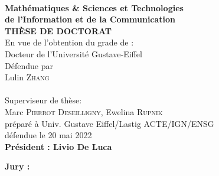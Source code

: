 \begin{titlepage}
\begin{center}
	
\vspace*{0.3cm}
 \\
\noindent \textbf{Math{\'e}matiques \& Sciences et Technologies\\de l’Information et de la Communication} \\
\vspace*{0.5cm}
\noindent \Huge \textbf{THÈSE DE DOCTORAT} \\
\vspace*{0.3cm}
\noindent \large {En vue de l’obtention du grade de :} \\
\vspace*{0.3cm}
\noindent \Large Docteur de l'Université Gustave-Eiffel\\
\vspace*{0.4cm}
\noindent \large {Défendue par\\}
\noindent \huge Lulin \textsc{Zhang} \\
\vspace*{0.8cm}
 \\
\vspace*{0.8cm}
\noindent \Large Superviseur de thèse: \\
Marc \textsc{Pierrot Deseilligny}, Ewelina \textsc{Rupnik}\\
\vspace*{0.2cm}
\noindent \Large préparé à Univ. Gustave Eiffel/Lastig ACTE/IGN/ENSG\\
\vspace*{0.2cm}
\noindent \large défendue le 20 mai 2022 \\
\vspace*{0.5cm}
\noindent \large \textbf{Président : Livio De Luca}
\end{center}
\noindent \large \textbf{Jury :} \\
\begin{center}

\end{center}
\end{titlepage}
